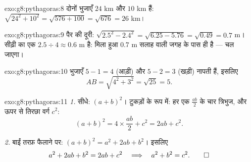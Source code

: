 \begin{solution}{exo:g8:pythagoras:8}
दोनों  भुजाएँ $24$ km और $10$ km हैं:
$\sqrt{24^2 + 10^2} = \sqrt{576 + 100} = \sqrt{676} = 26$ km।
\end{solution}

\begin{solution}{exo:g8:pythagoras:9}
पैर की दूरी: $\sqrt{2.5^2 - 2.4^2} = \sqrt{6.25 - 5.76} =
\sqrt{0.49} = 0.7$ m। सीढ़ी का एक 
$2.5 \div 4 \approx 0.6$ m है: मिला हुआ $0.7$ m सलाह वाली जगह के
पास ही है --- चल जाएगा।
\end{solution}

\begin{solution}{exo:g8:pythagoras:10}
 भुजाएँ $5 - 1 = 4$ (आड़ी) और $5 - 2 = 3$ (खड़ी) नापती हैं,
इसलिए
\[
AB = \sqrt{4^2 + 3^2} = \sqrt{25} = 5 .
\]
\end{solution}

\begin{solution}{exo:g8:pythagoras:11}
\emph{1.} सीधे: $(a + b)^2$। टुकड़ों के रूप में: हर एक
$\frac{ab}{2}$  के चार त्रिभुज, और ऊपर से तिरछा वर्ग
$c^2$:
\[
(a + b)^2 = 4 \times \frac{ab}{2} + c^2 = 2ab + c^2 .
\]

\emph{2.} बाईं तरफ़ फैलाने पर: $(a+b)^2 = a^2 + 2ab + b^2$।
इसलिए
\[
a^2 + 2ab + b^2 = 2ab + c^2
\quad\Longrightarrow\quad
a^2 + b^2 = c^2 . \qed
\]
\end{solution}

